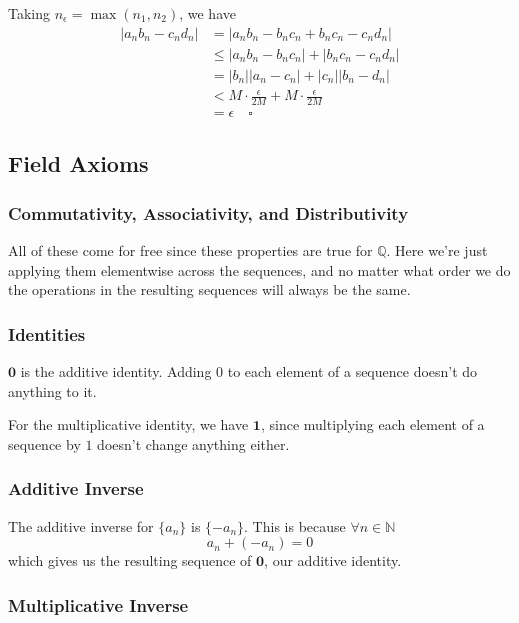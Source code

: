 \documentclass[12pt]{article}
\newcommand{\N}{\mathbb{N}}
\newcommand{\Q}{\mathbb{Q}}
\begin{document}
Taking $n_\epsilon = \max(n_1, n_2)$, we have
\begin{align*}
  |a_nb_n-c_nd_n|
   & = |a_nb_n-b_nc_n+b_nc_n-c_nd_n|                             \\
   & \le |a_nb_n-b_nc_n| + |b_nc_n-c_nd_n|                       \\
   & = |b_n||a_n - c_n| + |c_n||b_n-d_n|                         \\
   & < M \cdot \frac{\epsilon}{2M} + M \cdot \frac{\epsilon}{2M} \\
   & = \epsilon\quad\square
\end{align*}

\subsection{Field Axioms}

\subsubsection{Commutativity, Associativity, and Distributivity}

All of these come for free since these properties are true for $\Q$.
Here we're just applying them elementwise across the sequences,
and no matter what order we do the operations in the resulting sequences
will always be the same.

\subsubsection{Identities}

$\mathbf{0}$ is the additive identity.
Adding $0$ to each element of a sequence doesn't do anything to it.

For the multiplicative identity, we have $\mathbf{1}$,
since multiplying each element of a sequence by $1$ doesn't change anything either.

\subsubsection{Additive Inverse}

The additive inverse for $\{a_n\}$ is $\{-a_n\}$.
This is because $\forall n \in \N$
\[a_n + (-a_n) = 0\]
which gives us the resulting sequence of $\mathbf{0}$, our additive identity.

\subsubsection{Multiplicative Inverse}
\end{document}
